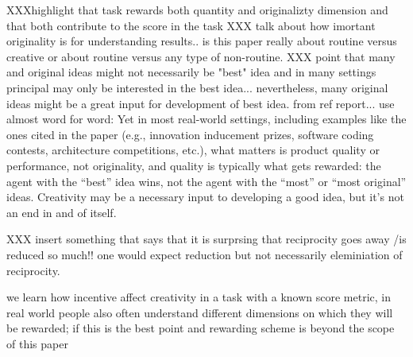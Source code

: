 

XXXhighlight that task rewards both quantity and originalizty dimension and that both contribute to the score in the task
XXX talk about how imortant originality is for understanding results.. is this paper really about routine versus creative or about routine versus any type of non-routine. 
XXX point that many and original ideas might not necessarily be "best" idea and in many settings principal may only be interested in the best idea... nevertheless, many original ideas might be a great input for development of best idea. from ref report... use almost word for word: Yet in most real-world settings, including examples like the ones cited in the paper (e.g., innovation inducement prizes, software coding contests, architecture competitions, etc.), what matters is product quality or performance, not originality, and quality is typically what gets rewarded: the agent with the “best” idea wins, not the agent with the “most” or “most original” ideas. Creativity may be a necessary input to developing a good idea, but it’s not an end in and of itself.

XXX insert something that says that it is surprsing that reciprocity goes away /is reduced so much!! one would expect reduction but not necessarily eleminiation of reciprocity. 


we learn how incentive affect creativity in a task with a known score metric, in real world people also often understand different dimensions on which they will be rewarded; if this is the best point and rewarding scheme is beyond the scope of this paper

